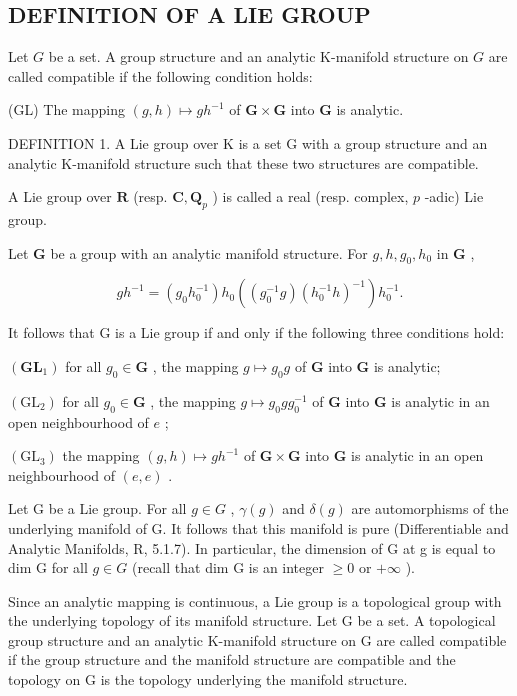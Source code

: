 \subsection{DEFINITION OF A LIE GROUP}

Let \(G\) be a set. A group structure and an analytic K-manifold structure on \(G\) are called compatible if the following condition holds:

(GL) The mapping \((g, h) \mapsto gh^{-1}\) of \(\mathbf{G} \times \mathbf{G}\) into \(\mathbf{G}\) is analytic.

DEFINITION 1. A Lie group over K is a set G with a group structure and an analytic K-manifold structure such that these two structures are compatible.

A Lie group over \(\mathbf{R}\) (resp. \(\mathbf{C},\mathbf{Q}_p\) ) is called a real (resp. complex, \(p\) -adic) Lie group.

Let \(\mathbf{G}\) be a group with an analytic manifold structure. For \(g, h, g_0, h_0\) in \(\mathbf{G}\) ,

\[
g h ^ {- 1} = (g _ {0} h _ {0} ^ {- 1}) h _ {0} ((g _ {0} ^ {- 1} g) (h _ {0} ^ {- 1} h) ^ {- 1}) h _ {0} ^ {- 1}.\tag{1}
\]

It follows that G is a Lie group if and only if the following three conditions hold:

\((\mathbf{GL}_1)\) for all \(g_0 \in \mathbf{G}\) , the mapping \(g \mapsto g_0 g\) of \(\mathbf{G}\) into \(\mathbf{G}\) is analytic;

\((\mathrm{GL}_2)\) for all \(g_0 \in \mathbf{G}\) , the mapping \(g \mapsto g_0gg_0^{-1}\) of \(\mathbf{G}\) into \(\mathbf{G}\) is analytic in an open neighbourhood of \(e\) ;

\((\mathrm{GL}_3)\) the mapping \((g,h)\mapsto gh^{-1}\) of \(\mathbf{G}\times \mathbf{G}\) into \(\mathbf{G}\) is analytic in an open neighbourhood of \((e,e)\) .

Let G be a Lie group. For all \(g \in G\) , \(\gamma(g)\) and \(\delta(g)\) are automorphisms of the underlying manifold of G. It follows that this manifold is pure (Differentiable and Analytic Manifolds, R, 5.1.7). In particular, the dimension of G at g is equal to dim G for all \(g \in G\) (recall that dim G is an integer \(\geqslant 0\) or \(+\infty\) ).

Since an analytic mapping is continuous, a Lie group is a topological group with the underlying topology of its manifold structure. Let G be a set. A topological group structure and an analytic K-manifold structure on G are called compatible if the group structure and the manifold structure are compatible and the topology on G is the topology underlying the manifold structure.

